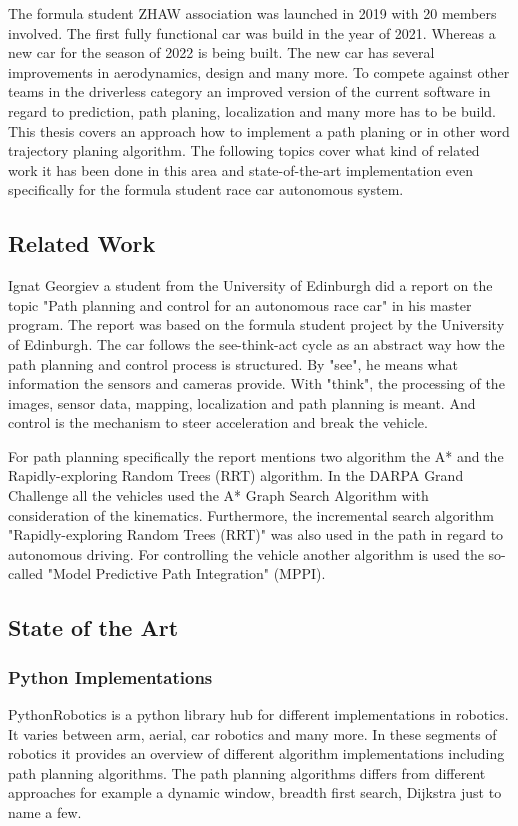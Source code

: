 The formula student ZHAW association was launched in 2019 with 20 members involved. The first fully functional car was build in the year of 2021. Whereas a new car for the season of 2022 is being built. The new car has several improvements in aerodynamics, design and many more. \cite{fszhaw_launch}
To compete against other teams in the driverless category an improved version of the current software in regard to prediction, path planing, localization and many more has to be build. This thesis covers an approach how to implement a path planing or in other word trajectory planing algorithm.
The following topics cover what kind of related work it has been done in this area and state-of-the-art implementation even specifically for the formula student race car autonomous system.

\subsection{Related Work}

Ignat Georgiev a student from the University of Edinburgh did a report on the topic "Path planning and control for an autonomous race car" in his master program. The report was based on the formula student project by the University of Edinburgh. The car follows the see-think-act cycle as an abstract way how the path planning and control process is structured. By "see", he means what information the sensors and cameras provide. With "think", the processing of the images, sensor data, mapping, localization and path planning is meant. And control is the mechanism to steer acceleration and break the vehicle.

For path planning specifically the report mentions two algorithm the A* and the Rapidly-exploring Random Trees (RRT) algorithm. In the DARPA Grand Challenge all the vehicles used the A* Graph Search Algorithm with consideration of the kinematics. Furthermore, the incremental search algorithm "Rapidly-exploring Random Trees (RRT)" was also used in the path in regard to autonomous driving.
For controlling the vehicle another algorithm is used the so-called "Model Predictive Path Integration" (MPPI).
\cite{path_planning_and_control_georgiev}

\subsection{State of the Art}


\subsubsection{Python Implementations}
PythonRobotics is a python library hub for different implementations in robotics. It varies between arm, aerial, car robotics and many more.
In these segments of robotics it provides an overview of different algorithm implementations including path planning algorithms.
The path planning algorithms differs from different approaches for example a dynamic window, breadth first search, Dijkstra just to name a few. 
\cite{python_robotics}

